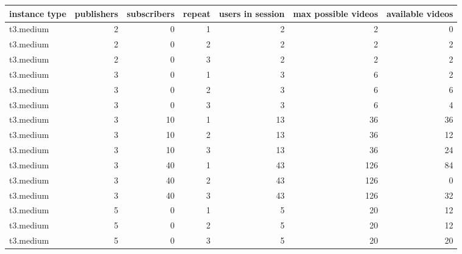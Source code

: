 \begin{tabular}{lrrrrrr}
\toprule
instance type &  publishers &  subscribers &  repeat &  users in session &  max possible videos &  available videos \\
\midrule
    t3.medium &           2 &            0 &       1 &                 2 &                    2 &                 0 \\
    t3.medium &           2 &            0 &       2 &                 2 &                    2 &                 2 \\
    t3.medium &           2 &            0 &       3 &                 2 &                    2 &                 2 \\
    t3.medium &           3 &            0 &       1 &                 3 &                    6 &                 2 \\
    t3.medium &           3 &            0 &       2 &                 3 &                    6 &                 6 \\
    t3.medium &           3 &            0 &       3 &                 3 &                    6 &                 4 \\
    t3.medium &           3 &           10 &       1 &                13 &                   36 &                36 \\
    t3.medium &           3 &           10 &       2 &                13 &                   36 &                12 \\
    t3.medium &           3 &           10 &       3 &                13 &                   36 &                24 \\
    t3.medium &           3 &           40 &       1 &                43 &                  126 &                84 \\
    t3.medium &           3 &           40 &       2 &                43 &                  126 &                 0 \\
    t3.medium &           3 &           40 &       3 &                43 &                  126 &                32 \\
    t3.medium &           5 &            0 &       1 &                 5 &                   20 &                12 \\
    t3.medium &           5 &            0 &       2 &                 5 &                   20 &                12 \\
    t3.medium &           5 &            0 &       3 &                 5 &                   20 &                20 \\

\end{tabular}
